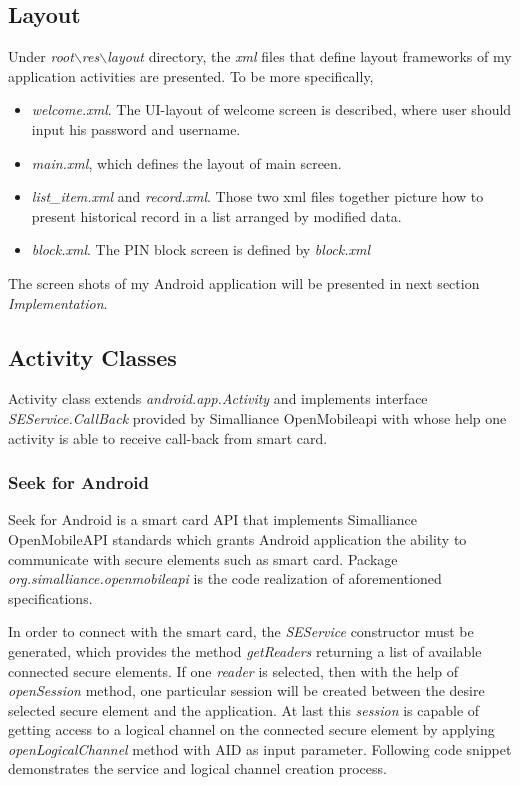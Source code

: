 \subsection{Layout} \label{secLayout}
Under \emph{root$\backslash$res$\backslash$layout} directory, the \emph{xml} files that define layout frameworks of my application activities are presented. To be more specifically,
\begin{itemize}
\item \emph{welcome.xml}. The UI-layout of welcome screen is described, where user should input his password and username.
\item \emph{main.xml}, which defines the layout of main screen.
\item \emph{list\_item.xml} and \emph{record.xml}. Those two xml files together picture how to present historical record in a list arranged by modified data.
\item \emph{block.xml}. The PIN block screen is defined by \emph{block.xml}
\end{itemize}
The screen shots of my Android application will be presented in next section \emph{Implementation}.


\subsection{Activity Classes}
Activity class extends \emph{android.app.Activity} and implements interface \emph{SEService.CallBack} provided by Simalliance OpenMobileapi with whose help one activity is able to receive call-back from smart card. 
\subsubsection{Seek for Android}
Seek for Android is a smart card API that implements Simalliance OpenMobileAPI standards which grants Android application the ability to communicate with secure elements such as smart card. Package \emph{org.simalliance.openmobileapi} is the code realization of aforementioned specifications.

In order to connect with the smart card, the \emph{SEService} constructor must be generated, which provides the method \emph{getReaders} returning a list of available connected secure elements. If one \emph{reader} is selected, then with the help of \emph{openSession} method, one particular session will be created between the desire selected secure element and the application. At last this \emph{session} is capable of getting access to a logical channel on the connected secure element by applying \emph{openLogicalChannel} method with AID as input parameter. Following code snippet demonstrates the service and logical channel creation process\cite{open}.

